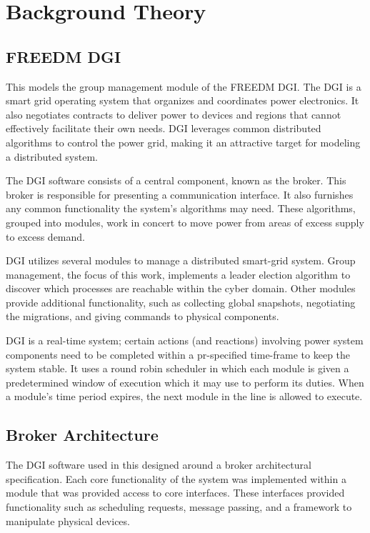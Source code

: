 \chapter{Background Theory}

\section{FREEDM DGI}
This models the group management module of the FREEDM DGI.
The DGI is a smart grid operating system that organizes and coordinates power electronics.
It also negotiates contracts to deliver power to devices and regions that cannot effectively facilitate their own needs.
DGI leverages common distributed algorithms to control the power grid, making it an attractive target for modeling a distributed system.

The DGI software consists of a central component, known as the broker.
This broker is responsible for presenting a communication interface.
It also furnishes any common functionality the system's algorithms may need.
These algorithms, grouped into modules, work in concert to move power from areas of excess supply to excess demand.

DGI utilizes several modules to manage a distributed smart-grid system.
Group management, the focus of this work, implements a leader election algorithm to discover which processes are reachable within the cyber domain.
Other modules provide additional functionality, such as collecting global snapshots, negotiating the migrations, and giving commands to physical components.

DGI is a real-time system; certain actions (and reactions) involving power system components need to be completed within a pr-specified time-frame to keep the system stable.
It uses a round robin scheduler in which each module is given a predetermined window of execution which it may use to perform its duties.
When a module's time period expires, the next module in the line is allowed to execute. 

\section{Broker Architecture}

The DGI software used in this designed around a broker architectural specification.
Each core functionality of the system was implemented within a module that was provided access to core interfaces.
These interfaces provided functionality such as scheduling requests, message passing, and a framework to manipulate physical devices.

